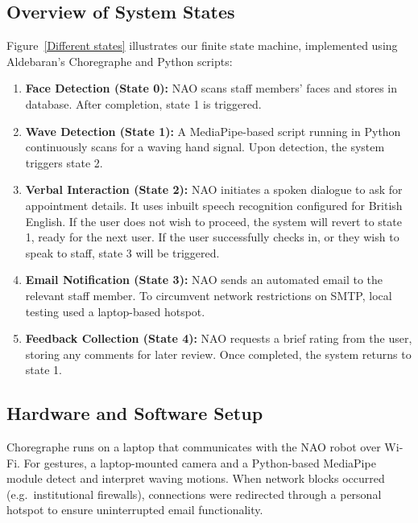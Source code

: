 \documentclass[conference]{IEEEtran}
\begin{document}
\subsection{Overview of System States} Figure~\ref{Different states} illustrates our finite state machine, implemented
using Aldebaran’s Choregraphe and Python scripts:

\begin{enumerate} \item \textbf{Face Detection (State 0):} NAO scans staff members’ faces and stores in database. After completion, state 1 is triggered.
        \item \textbf{Wave Detection (State 1):} A MediaPipe-based script running in Python continuously scans for a waving hand signal. Upon detection, the system triggers state 2. 
        \item \textbf{Verbal Interaction (State 2):} NAO initiates a spoken dialogue to ask for appointment details. It uses inbuilt speech recognition configured for British English. If the user does not wish to proceed, the system will revert to state 1, ready for the next user. If the user successfully checks in, or they wish to speak to staff, state 3 will be triggered.
        \item \textbf{Email Notification (State 3):} NAO sends an automated email to the relevant staff member. To circumvent network restrictions on SMTP, local testing used a laptop-based hotspot.
        \item \textbf{Feedback Collection (State 4):} NAO requests a brief rating from the user, storing any comments for later review. Once completed, the system returns to state 1.
\end{enumerate}

\subsection{Hardware and Software Setup} Choregraphe runs on a laptop that communicates with the NAO robot over Wi-Fi.
For gestures, a laptop-mounted camera and a Python-based MediaPipe module detect and interpret waving motions.
When network blocks occurred (e.g.\ institutional firewalls), connections were redirected through a personal hotspot to ensure uninterrupted email functionality.
\end{document}
